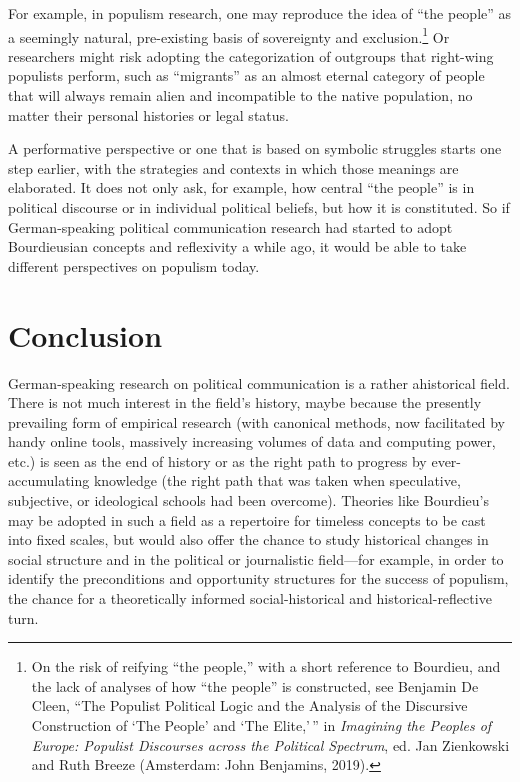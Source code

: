 \documentclass{tufte-handout}
\begin{document}
For example, in populism research, one may reproduce the idea of ``the
people'' as a seemingly natural, pre-existing basis of sovereignty and
exclusion.\footnote{On the risk of reifying ``the people,'' with a short
  reference to Bourdieu, and the lack of analyses of how ``the people''
  is constructed, see Benjamin De Cleen, ``The Populist Political Logic
  and the Analysis of the Discursive Construction of `The People' and
  `The Elite,'\,'' in \emph{Imagining the Peoples of Europe: Populist
  Discourses across the Political Spectrum}, ed. Jan Zienkowski and Ruth
  Breeze (Amsterdam: John Benjamins, 2019).} Or researchers might risk
adopting the categorization of outgroups that right-wing populists
perform, such as ``migrants'' as an almost eternal category of people
that will always remain alien and incompatible to the native population,
no matter their personal histories or legal status.

A performative perspective or one that is based on symbolic struggles
starts one step earlier, with the strategies and contexts in which those
meanings are elaborated. It does not only ask, for example, how central
``the people'' is in political discourse or in individual political
beliefs, but how it is constituted. So if German-speaking political
communication research had started to adopt Bourdieusian concepts and
reflexivity a while ago, it would be able to take different perspectives
on populism today.

\hypertarget{conclusion}{%
\section{Conclusion}\label{conclusion}}

German-speaking research on political communication is a rather
ahistorical field. There is not much interest in the field's history,
maybe because the presently prevailing form of empirical research (with
canonical methods, now facilitated by handy online tools, massively
increasing volumes of data and computing power, etc.) is seen as the end
of history or as the right path to progress by ever-accumulating
knowledge (the right path that was taken when speculative, subjective,
or ideological schools had been overcome). Theories like Bourdieu's may
be adopted in such a field as a repertoire for timeless concepts to be
cast into fixed scales, but would also offer the chance to study
historical changes in social structure and in the political or
journalistic field---for example, in order to identify the preconditions
and opportunity structures for the success of populism, the chance for a
theoretically informed social-historical and historical-reflective turn.
\end{document}
